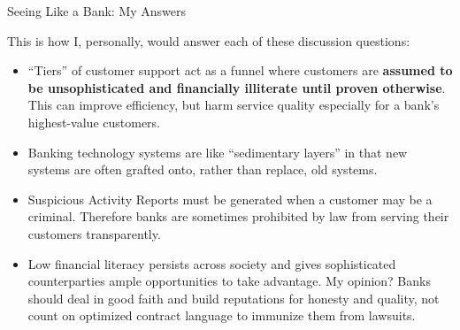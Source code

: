 \documentclass[aspectratio=169]{beamer}
\begin{document}
\begin{frame}{Seeing Like a Bank: My Answers}

This is how I, personally, would answer each of these discussion questions: 

\begin{itemize}
    
    \item ``Tiers'' of customer support act as a funnel where customers are \textbf{assumed to be unsophisticated and financially illiterate until proven otherwise}. This can improve efficiency, but harm service quality especially for a bank's highest-value customers. 
    \pause 

    \item Banking technology systems are like ``sedimentary layers'' in that new systems are often grafted onto, rather than replace, old systems. \pause 

    \item Suspicious Activity Reports must be generated when a customer may be a criminal. Therefore banks are sometimes prohibited by law from serving their customers transparently. \pause 

    \item Low financial literacy persists across society and gives sophisticated counterparties ample opportunities to take advantage. My opinion? Banks should deal in good faith and build reputations for honesty and quality, not count on optimized contract language to immunize them from lawsuits. 
    
\end{itemize}
    
\end{frame}
\end{document}
